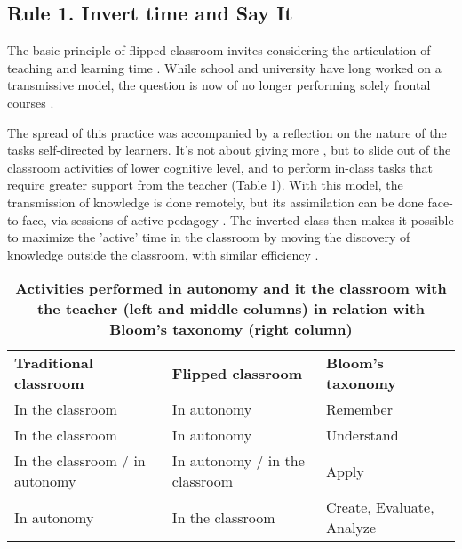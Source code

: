 \documentclass[10pt,letterpaper]{article}
\newlength\savedwidth
\newcommand\thickhline{\noalign{\global\savedwidth\arrayrulewidth\global\arrayrulewidth 2pt}%
\hline
\noalign{\global\arrayrulewidth\savedwidth}}
\begin{document}
\subsection{Rule 1. Invert time and Say It }

The basic principle of flipped classroom invites considering the articulation of teaching and learning time \cite{bergmann_flip_2012,schell_flipping_2015}. While school and university have long worked on a transmissive model, 
the question is now of no longer performing solely frontal courses \cite{crouch_peer_2001}.

The spread of this practice was accompanied by a reflection on the nature of the tasks self-directed by learners. 
It's not about giving more \cite{lo_critical_2017}, but to slide out of the classroom activities of lower cognitive level, 
and to perform in-class tasks that require greater support from the teacher \cite{lebrun_vers_2016,anderson_taxonomy_2001,bloom_taxonomy_1956,sarawagi_flipped_2014} (Table 1). 
With this model, the transmission of knowledge is done remotely, but its assimilation can be done face-to-face, 
via sessions of active pedagogy \cite{freeman_reply_2014}. 
The inverted class then makes it possible to maximize the 'active' time in the classroom 
by moving the discovery of knowledge outside the classroom, with similar efficiency \cite{delozier_flipped_2017}.


\begin{table}[!ht]
\begin{adjustwidth}{-2.25in}{0in} %
\centering
\caption{{\bf Activities performed in autonomy and it the classroom with the teacher (left and middle columns) in relation with Bloom's taxonomy (right column)}}
\begin{tabular}{|l|l|l|}
\hline
{\bf Traditional classroom} & {\bf Flipped classroom} & {\bf Bloom's taxonomy} \\ \thickhline
In the classroom & In autonomy & Remember \\ \hline
In the classroom & In autonomy & Understand \\ \hline
In the classroom / in autonomy & In autonomy / in the classroom & Apply \\ \hline
In autonomy & In the classroom & Create, Evaluate, Analyze \\ \hline



\end{tabular}
\label{table1}
\end{adjustwidth}
\end{table}
\end{document}

